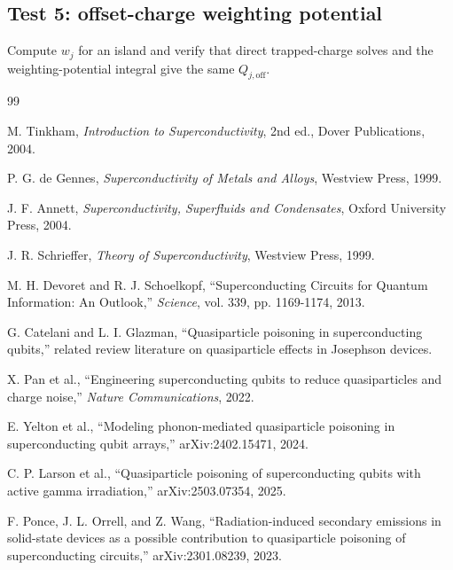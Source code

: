 \documentclass[11pt]{article}
\begin{document}
\subsection{Test 5: offset-charge weighting potential}

Compute $w_j$ for an island and verify that direct trapped-charge solves and the weighting-potential integral give the same $Q_{j,\mathrm{off}}$.


\begin{thebibliography}{99}

M. Tinkham, \textit{Introduction to Superconductivity}, 2nd ed., Dover Publications, 2004.

P. G. de Gennes, \textit{Superconductivity of Metals and Alloys}, Westview Press, 1999.

J. F. Annett, \textit{Superconductivity, Superfluids and Condensates}, Oxford University Press, 2004.

J. R. Schrieffer, \textit{Theory of Superconductivity}, Westview Press, 1999.

M. H. Devoret and R. J. Schoelkopf, ``Superconducting Circuits for Quantum Information: An Outlook,'' \textit{Science}, vol. 339, pp. 1169-1174, 2013.

G. Catelani and L. I. Glazman, ``Quasiparticle poisoning in superconducting qubits,'' related review literature on quasiparticle effects in Josephson devices.

X. Pan et al., ``Engineering superconducting qubits to reduce quasiparticles and charge noise,'' \textit{Nature Communications}, 2022.

E. Yelton et al., ``Modeling phonon-mediated quasiparticle poisoning in superconducting qubit arrays,'' arXiv:2402.15471, 2024.

C. P. Larson et al., ``Quasiparticle poisoning of superconducting qubits with active gamma irradiation,'' arXiv:2503.07354, 2025.

F. Ponce, J. L. Orrell, and Z. Wang, ``Radiation-induced secondary emissions in solid-state devices as a possible contribution to quasiparticle poisoning of superconducting circuits,'' arXiv:2301.08239, 2023.

\end{thebibliography}
\end{document}
